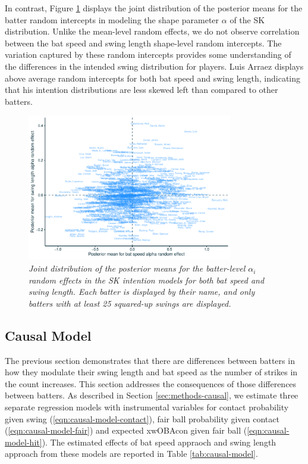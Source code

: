 \documentclass{article}
\begin{document}
       In contrast, Figure \ref{fig:alpha-re} displays the joint distribution of the posterior means for the batter random intercepts in modeling the shape parameter $\alpha$ of the SK distribution. Unlike the mean-level random effects, we do not observe correlation between the bat speed and swing length shape-level random intercepts. The variation captured by these random intercepts provides some understanding of the differences in the intended swing distribution for players. Luis Arraez displays above average random intercepts for both bat speed and swing length, indicating that his intention distributions are less skewed left than compared to other batters. 
                
      \begin{figure}
        \centering
        \includegraphics[width = 0.8\textwidth]{../../figures/alpha_re.pdf}
        \caption{\it Joint distribution of the posterior means for the batter-level $\alpha_i$ random effects in the SK intention models for both bat speed and swing length. Each batter is displayed by their name, and only batters with at least 25 squared-up swings are displayed.}
        \label{fig:alpha-re}
      \end{figure}
      
    \subsection{Causal Model}
    \label{sec:results-causal}

      The previous section demonstrates that there are differences between batters in how they modulate their swing length and bat speed as the number of strikes in the count increases. This section addresses the consequences of those differences between batters. As described in Section \ref{sec:methods-causal}, we estimate three separate regression models with instrumental variables for contact probability given swing (\ref{eqn:causal-model-contact}), fair ball probability given contact (\ref{eqn:causal-model-fair}) and expected xwOBAcon given fair ball (\ref{eqn:causal-model-hit}). The estimated effects of bat speed appraoch and swing length approach from these models are reported in Table \ref{tab:causal-model}.
\end{document}
